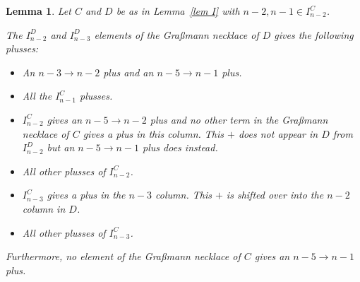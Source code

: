 \documentclass[11pt]{article}
\newtheorem{lem}[thm]{Lemma}
\theoremstyle{remark}
\theoremstyle{definition}
\begin{document}
\begin{lem}\label{lem n-2 bad}
  Let $C$ and $D$ be as in Lemma~\ref{lem I} with $n-2,n-1 \in I_{n-2}^{C}$.

  The $I_{n-2}^{D}$ and $I_{n-3}^{D}$ elements of the Gra\ss mann necklace of $D$ gives the following plusses:
  \begin{itemize}
  \item An $n-3\rightarrow n-2$ plus and an $n-5\rightarrow n-1$ plus.
  \item All the $I_{n-1}^{C}$ plusses.
  \item $I_{n-2}^{C}$ gives an $n-5\rightarrow n-2$ plus and no other term in the Gra\ss mann necklace of $C$ gives a plus in this column.  This $+$ does not appear in $D$ from $I_{n-2}^{D}$ but an $n-5\rightarrow n-1$ plus does instead.
  \item All other plusses of $I_{n-2}^{C}$.
  \item $I_{n-3}^{C}$ gives a plus in the $n-3$ column.  This $+$ is shifted over into the $n-2$ column in $D$.
  \item All other plusses of $I_{n-3}^{C}$.
  \end{itemize}
  Furthermore, no element of the Gra\ss mann necklace of $C$ gives an $n-5\rightarrow n-1$ plus.
\end{lem}
\end{document}
